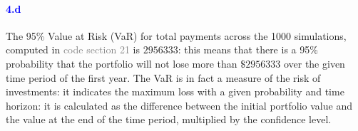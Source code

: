 \documentclass[a4paper,12pt]{article}
\begin{document}
\paragraph{\textcolor{Blue}{4.d}} The 95\% Value at Risk (VaR) for total payments across the 1000 simulations, computed in \textcolor{gray}{code section 21} is $2956333$: this means that there is a 95\% probability that the portfolio will not lose more than $\$2956333$ over the given time period of the first year. The VaR is in fact a measure of the risk of investments: it indicates the maximum loss with a given probability and time horizon: it is calculated as the difference between the initial portfolio value and the value at the end of the time period, multiplied by the confidence level.
\end{document}
